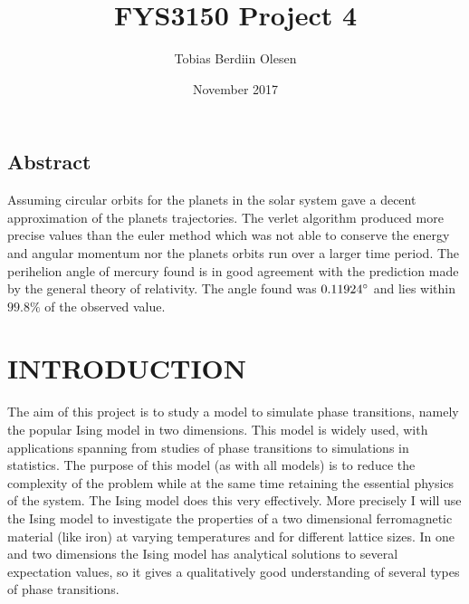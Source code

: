 \documentclass[twocolumn]{article}
\begin{document}
\title{\vspace{-2.5cm}FYS3150 Project 4}
\author{Tobias Berdiin Olesen}
\date{November 2017}
\maketitle
\onecolumngrid
\noindent\makebox[\linewidth]{\rule{\paperwidth}{0.4pt}}
\begin{center}
\section*{Abstract}
Assuming circular orbits for the planets in the solar system gave a decent approximation of the planets trajectories. The verlet algorithm produced more precise values than the euler method which was not able to conserve the energy and angular momentum nor the planets orbits run over a larger time period. The perihelion angle of mercury found is in good agreement with the prediction made by the general theory of relativity. The angle found was $0.11924\degree$ and lies within $99.8\%$ of the observed value. 
\end{center}

\noindent\makebox[\linewidth]{\rule{\paperwidth}{0.4pt}}
\newline
\twocolumngrid

\section{INTRODUCTION}
The aim of this project is to study a model to simulate phase transitions, namely the popular Ising model in two dimensions. This model is widely used, with applications spanning from studies of phase transitions to simulations in statistics.\newline
The purpose of this model (as with all models) is to reduce the complexity of the problem while at the same time retaining the essential physics of the system. The Ising model does this very effectively.
More precisely I will use the Ising model to investigate the properties of a two dimensional ferromagnetic material (like iron) at varying temperatures and for different lattice sizes.
In one and two dimensions the Ising model has analytical solutions to several expectation values, so it gives a qualitatively good understanding of several types of phase transitions.\newline
\end{document}
